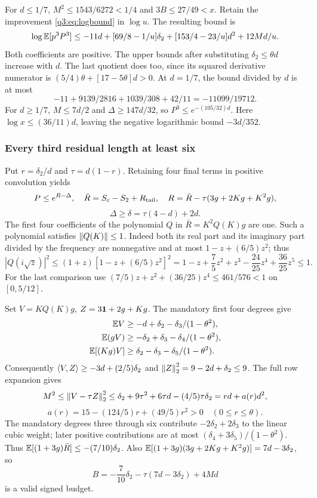 For $d\le1/7$, $M^2\le1543/6272<1/4$ and $3B\le27/49<x$. Retain the improvement \eqref{q3:eq:logbound} in $\log u$. The resulting bound is
\[
 \log\mathbb E[p^3P^3]\le
 -11d+[69/8-1/u]\delta_{2}+[153/4-23/u]d^2+12Md/u .
\]
Both coefficients are positive. The upper bounds after substituting $\delta_{2}\le\theta d$ increase with $d$. The last quotient does too, since its squared derivative numerator is
$(5/4)\theta+[17-5\theta]d>0$.
At $d=1/7$, the bound divided by $d$ is at most
\[
 -11+9139/2816+1039/308+42/11=-11099/19712.
\]
For $d\ge1/7$, $M\le7d/2$ and $\Delta\ge147d/32$, so $P^3\le e^{-(105/32)d}$.
Here $\log x\le(36/11)d$, leaving the negative logarithmic bound $-3d/352$.

\subsubsection{Every third residual length at least six}
Put $r=\delta_{2}/d$ and $\tau=d(1-r)$. Retaining four final terms in positive convolution yields
\[
 P\le e^{R-\Delta},\quad
 \bar R=S_c-S_2+R_{\rm tail},\quad
 R=\bar R-\tau(3g+2Kg+K^2g),
\]
\[
 \Delta\ge\delta=\tau(4-d)+2d.
\]
The first four coefficients of the polynomial $Q$ in $\bar R=K^2Q(K)g$ are one. Such a polynomial satisfies $\left\lVert Q(K)\right\rVert\le1$. Indeed both its real part and its imaginary part divided by the frequency are nonnegative and at most $1-z+(6/5)z^2$; thus
\[
 |Q(i\sqrt z)|^2\le(1+z)[1-z+(6/5)z^2]^2
 =1-z+\frac75z^2+z^3-\frac{24}{25}z^4+\frac{36}{25}z^5\le1.
\]
For the last comparison use $(7/5)z+z^2+(36/25)z^4\le461/576<1$ on $[0,5/12]$.

Set $V=KQ(K)g$, $Z=3\mathbf1+2g+Kg$. The mandatory first four degrees give
\[
\begin{split}
 \mathbb E V&\ge-d+\delta_{2}-\delta_{3}/(1-\theta^2),\\
 \mathbb E(gV)&\ge-\delta_{2}+\delta_{3}-\delta_{4}/(1-\theta^2),\\
 \mathbb E[(Kg)V]&\ge \delta_{2}-\delta_{3}-\delta_{5}/(1-\theta^2).
\end{split}
\]
Consequently $\left\langle V,Z\right\rangle\ge-3d+(2/5)\delta_{2}$ and $\left\lVert Z\right\rVert_2^2=9-2d+\delta_{2}\le9$. The full row expansion gives
\[
 M^2\le\left\lVert V-\tau Z\right\rVert_2^2
 \le \delta_{2}+9\tau^2+6\tau d-(4/5)\tau \delta_{2}
 =rd+a(r)d^2,
\]
\[
 a(r)=15-(124/5)r+(49/5)r^2>0\quad(0\le r\le\theta).
\]
The mandatory degrees three through six contribute $-2\delta_{2}+2\delta_{3}$ to the linear cubic weight; later positive contributions are at most
$(\delta_{4}+3\delta_{5})/(1-\theta^2)$. Thus $\mathbb E[(1+3g)\bar R]\le-(7/10)\delta_{2}$.
Also $\mathbb E[(1+3g)(3g+2Kg+K^2g)]=7d-3\delta_{2}$, so
\[
 B=-\frac7{10}\delta_{2}-\tau(7d-3\delta_{2})+4Md
\]
is a valid signed budget.


